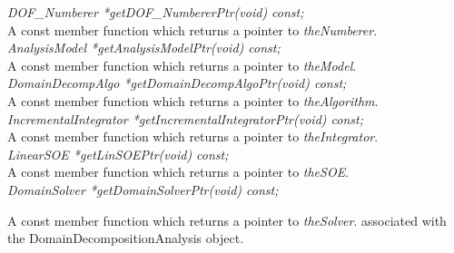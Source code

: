 {\em DOF\_Numberer *getDOF\_NumbererPtr(void) const;}\\
A const member function which returns a pointer to {\em
theNumberer}.\\

{\em AnalysisModel  *getAnalysisModelPtr(void) const;}\\
A const member function which returns a pointer to {\em
theModel}.\\

{\em DomainDecompAlgo  *getDomainDecompAlgoPtr(void) const;}\\
A const member function which returns a pointer to {\em
theAlgorithm}.\\

{\em IncrementalIntegrator *getIncrementalIntegratorPtr(void) const;}\\
A const member function which returns a pointer to {\em
theIntegrator}.\\

{\em LinearSOE *getLinSOEPtr(void) const;}\\
A const member function which returns a pointer to {\em theSOE}.\\

{\em DomainSolver *getDomainSolverPtr(void) const;} 

A const member function which returns a pointer to {\em theSolver}.
associated with the DomainDecompositionAnalysis object. \\

